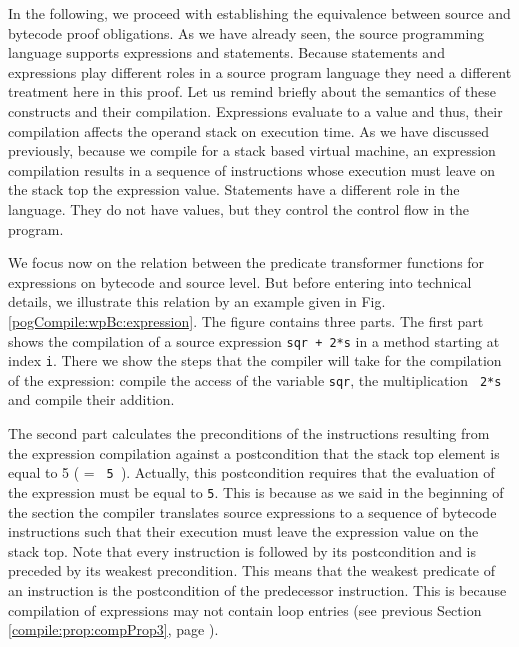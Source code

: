 \newtheorem{thm}{Theorem}[section]



 
In the following, we proceed with establishing the equivalence between source and bytecode 
proof obligations. As we have already seen, the source programming language supports 
expressions  and statements. Because statements and expressions play different roles in  a source program language 
they need a different treatment here in this proof. Let us remind briefly about the semantics of these constructs and their compilation. 
Expressions evaluate to a value and thus, their compilation affects the operand stack on execution time. 
As we have discussed previously, because we compile for a stack based virtual machine,
an expression compilation   results in a sequence of instructions whose execution must leave on the stack top the expression value.
Statements have a different role in the language. They do not have values, but they control the control flow in the program. 
   
We focus now on the relation between the \wpName{} predicate transformer functions for expressions 
on bytecode and source level. But before entering into technical details, we illustrate this relation
 by an example given in Fig.\ref{pogCompile:wpBc:expression}.
The figure contains three parts. The first part shows the compilation of a source expression \lstinline!sqr + 2*s! in a method \methodd{} starting at index \lstinline!i!.
There we show the steps that the compiler will take for the compilation of the expression: compile the access of the variable \lstinline!sqr!,
the multiplication  \lstinline! 2*s! and compile their addition. 

The second part calculates the preconditions of the instructions resulting from the 
 expression compilation against a postcondition that the stack top element is equal to 5 (\stack{\counter} = \lstinline! 5 !). 
Actually, this postcondition requires that the evaluation of the expression must be equal to \lstinline!5!. 
This is because as we said in the beginning of the section the compiler translates source expressions to a sequence of bytecode instructions
 such that their execution 
must leave the expression value on the stack top. 
Note that every instruction is followed by its postcondition and is preceded by its weakest  precondition.  This means that the weakest predicate of an instruction is the
postcondition of the predecessor instruction. This is because compilation of  expressions may not contain loop entries
 (see previous Section \ref{compile:prop:compProp3}, page \pageref{compile:prop:compProp3}).  


